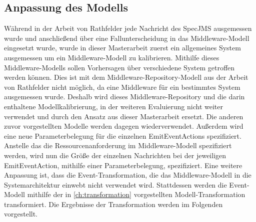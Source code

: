 \subsection{Anpassung des Modells}
Während in der Arbeit von Rathfelder jede Nachricht des SpecJMS ausgemessen wurde und anschließend über eine Fallunterscheidung in das Middleware-Modell eingesetzt wurde, wurde in dieser Masterarbeit zuerst ein allgemeines System ausgemessen um ein Middleware-Modell zu kalibrieren. Mithilfe dieses Middleware-Modells sollen Vorhersagen über verschiedene System getroffen werden können. Dies ist mit dem Middleware-Repository-Modell aus der Arbeit von Rathfelder nicht möglich, da eine Middleware für ein bestimmtes System ausgemessen wurde. Deshalb wird dieses Middleware-Repository und die darin enthaltene Modellkalibrierung, in der weiteren Evaluierung nicht weiter verwendet und durch den Ansatz aus dieser Masterarbeit ersetzt. 
Die anderen zuvor vorgestellten Modelle werden dagegen wiederverwendet. Außerdem wird eine neue Parameterbelegung für die einzelnen EmitEventActions spezifiziert. Anstelle das die Ressourcenanforderung im Middleware-Modell spezifiziert werden, wird nun die Größe der einzelnen Nachrichten bei der jeweiligen EmitEventAction, mithilfe einer Parameterbelegung, spezifiziert. Eine weitere Anpassung ist, dass die Event-Transformation, die das Middleware-Modell in die Systemarchitektur einwebt nicht verwendet wird. Stattdessen werden die Event-Modell mithilfe der in \autoref{ch:transformation} vorgestellten Modell-Transformation transformiert. Die Ergebnisse der Transformation werden im Folgenden vorgestellt.





